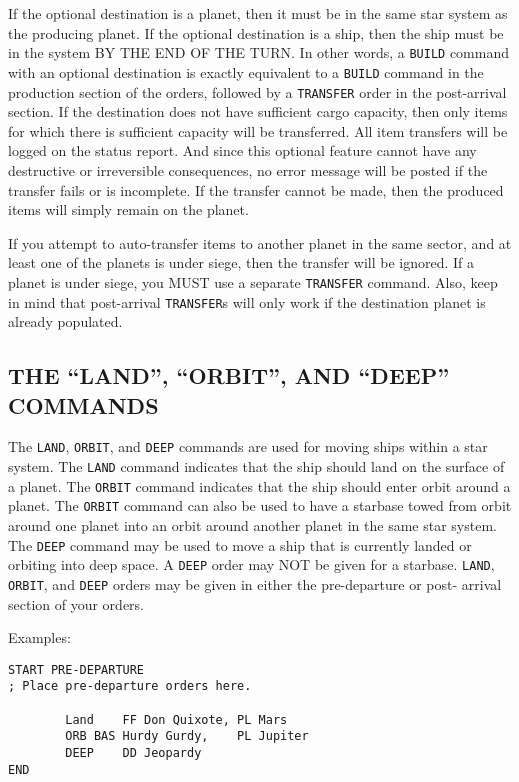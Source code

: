 \documentclass[10pt,titlepage]{article}
\begin{document}
If the optional destination is a planet, then it must be in the same star
system as the producing planet.  If the optional destination is a ship, then
the ship must be in the system BY THE END OF THE TURN.  In other words, a \texttt{BUILD}
command with an optional destination is exactly equivalent to a \texttt{BUILD} command
in the production section of the orders, followed by a \texttt{TRANSFER} order in the
post-arrival section.  If the destination does not have sufficient cargo
capacity, then only items for which there is sufficient capacity will be
transferred.  All item transfers will be logged on the status report.  And
since this optional feature cannot have any destructive or irreversible
consequences, no error message will be posted if the transfer fails or is
incomplete.  If the transfer cannot be made, then the produced items will
simply remain on the planet.

\begin{importantnote}
	If you attempt to auto-transfer items to another planet in the
	same sector, and at least one of the planets is under siege, then
	the transfer will be ignored.  If a planet is under siege, you
	MUST use a separate \texttt{TRANSFER} command.  Also, keep in mind that
	post-arrival \texttt{TRANSFER}s will only work if the destination planet
	is already populated.
\end{importantnote}

\subsection{THE ``LAND'', ``ORBIT'', AND ``DEEP'' COMMANDS}
\label{sec:landorbitdeep}

The \texttt{LAND}, \texttt{ORBIT}, and \texttt{DEEP} commands are used for moving ships within a star
system.  The \texttt{LAND} command indicates that the ship should land on the surface of
a planet.  The \texttt{ORBIT} command indicates that the ship should enter orbit around
a planet.  The \texttt{ORBIT} command can also be used to have a starbase towed from
orbit around one planet into an orbit around another planet in the same star
system.  The \texttt{DEEP} command may be used to move a ship that is currently landed
or orbiting into deep space.  A \texttt{DEEP} order may NOT be given for a starbase.
\texttt{LAND}, \texttt{ORBIT}, and \texttt{DEEP} orders may be given in either the pre-departure or post-
arrival section of your orders.

\noindent Examples:
\begin{verbatim}
START PRE-DEPARTURE
; Place pre-departure orders here.

        Land    FF Don Quixote, PL Mars 
        ORB BAS Hurdy Gurdy,    PL Jupiter
        DEEP    DD Jeopardy
END
\end{verbatim} 
\end{document}
